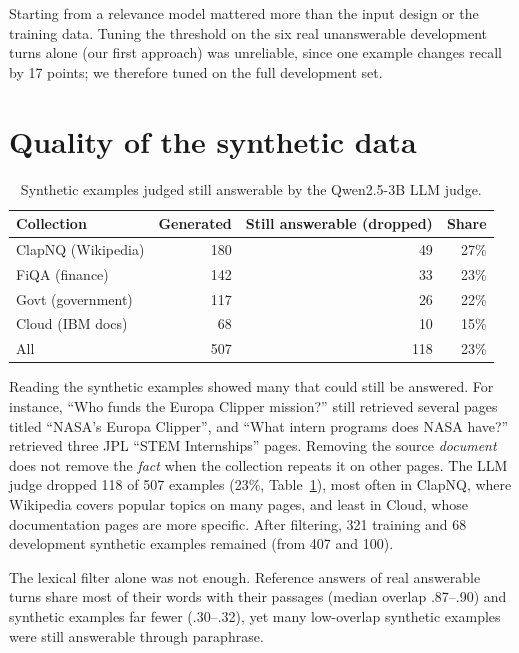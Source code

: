\documentclass[11pt,a4paper]{report}
\begin{document}
Starting from a relevance model mattered more than the input design or the training data. Tuning the threshold on the six real unanswerable development turns alone (our first approach) was unreliable, since one example changes recall by 17 points; we therefore tuned on the full development set.

\section{Quality of the synthetic data}
\begin{table}[H]
\centering\small
\begin{tabular}{@{}lrrr@{}}
\toprule
Collection & Generated & Still answerable (dropped) & Share \\
\midrule
ClapNQ (Wikipedia) & 180 & 49 & 27\% \\
FiQA (finance) & 142 & 33 & 23\% \\
Govt (government) & 117 & 26 & 22\% \\
Cloud (IBM docs) & 68 & 10 & 15\% \\
\midrule
All & 507 & 118 & 23\% \\
\bottomrule
\end{tabular}
\caption{Synthetic examples judged still answerable by the Qwen2.5-3B LLM judge.}
\label{tab:synth}
\end{table}
Reading the synthetic examples showed many that could still be answered. For instance, ``Who funds the Europa Clipper mission?'' still retrieved several pages titled ``NASA's Europa Clipper'', and ``What intern programs does NASA have?'' retrieved three JPL ``STEM Internships'' pages. Removing the source \emph{document} does not remove the \emph{fact} when the collection repeats it on other pages. The LLM judge dropped 118 of 507 examples (23\%, Table~\ref{tab:synth}), most often in ClapNQ, where Wikipedia covers popular topics on many pages, and least in Cloud, whose documentation pages are more specific. After filtering, 321 training and 68 development synthetic examples remained (from 407 and 100).

The lexical filter alone was not enough. Reference answers of real answerable turns share most of their words with their passages (median overlap .87--.90) and synthetic examples far fewer (.30--.32), yet many low-overlap synthetic examples were still answerable through paraphrase.
\end{document}

